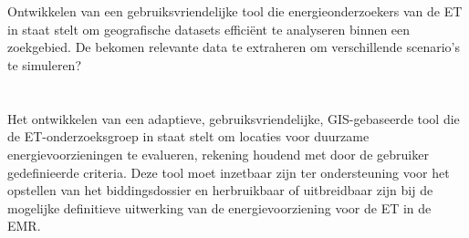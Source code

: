
\section{}\label{sec:onderzoeksvraag}

Ontwikkelen van een gebruiksvriendelijke tool die energieonderzoekers van de ET in staat stelt om geografische datasets efficiënt te analyseren binnen een zoekgebied. De bekomen relevante data te extraheren om verschillende scenario's te simuleren?


\section{}\label{sec:onderzoeksdoelstelling}

Het ontwikkelen van een adaptieve, gebruiksvriendelijke, GIS-gebaseerde tool die de ET-onderzoeksgroep in staat stelt om locaties voor duurzame energievoorzieningen te evalueren, rekening houdend met door de gebruiker gedefinieerde criteria. Deze tool moet inzetbaar zijn ter ondersteuning voor het opstellen van het biddingsdossier en herbruikbaar of uitbreidbaar zijn bij de mogelijke definitieve uitwerking van de energievoorziening voor de ET in de EMR.\@




